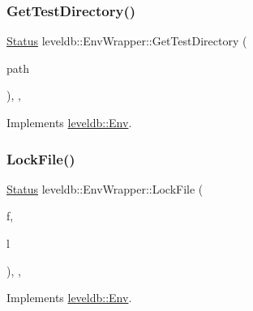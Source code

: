 \subsubsection{\texorpdfstring{GetTestDirectory()}{GetTestDirectory()}}
{\footnotesize\ttfamily \mbox{\hyperlink{classleveldb_1_1_status}{Status}} leveldb\+::\+Env\+Wrapper\+::\+Get\+Test\+Directory (\begin{DoxyParamCaption}\item[{std\+::string $\ast$}]{path }\end{DoxyParamCaption})\hspace{0.3cm}{\ttfamily [inline]}, {\ttfamily [override]}, {\ttfamily [virtual]}}



Implements \mbox{\hyperlink{classleveldb_1_1_env_ab57a55be37d4d57bf3c0ff83ee689f95}{leveldb\+::\+Env}}.

\mbox{\label{classleveldb_1_1_env_wrapper_a1f571f5f4eef62ee5437991aeba52b71}} 
\subsubsection{\texorpdfstring{LockFile()}{LockFile()}}
{\footnotesize\ttfamily \mbox{\hyperlink{classleveldb_1_1_status}{Status}} leveldb\+::\+Env\+Wrapper\+::\+Lock\+File (\begin{DoxyParamCaption}\item[{const std\+::string \&}]{f,  }\item[{\mbox{\hyperlink{classleveldb_1_1_file_lock}{File\+Lock}} $\ast$$\ast$}]{l }\end{DoxyParamCaption})\hspace{0.3cm}{\ttfamily [inline]}, {\ttfamily [override]}, {\ttfamily [virtual]}}



Implements \mbox{\hyperlink{classleveldb_1_1_env_a9b7266f0444f832e428328ff19b7b54c}{leveldb\+::\+Env}}.

\mbox{\label{classleveldb_1_1_env_wrapper_a8fc08d24c02191608af21473504ea15e}} 
